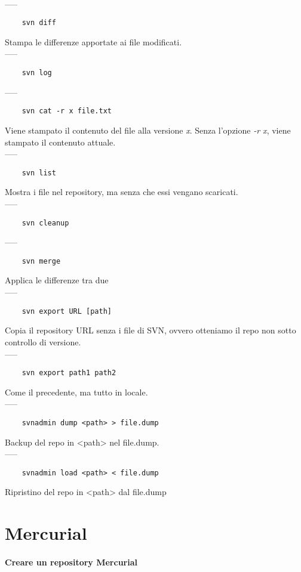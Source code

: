 \documentclass[a4paper]{article}
\begin{document}
	\\-----
	\begin{verbatim}
	svn diff
	\end{verbatim}
	Stampa le differenze apportate ai file modificati.\\-----
	\begin{verbatim}
	svn log
	\end{verbatim}
	-----
	\begin{verbatim}
	svn cat -r x file.txt 
	\end{verbatim}
	Viene stampato il contenuto del file alla versione \textit{x}. Senza l'opzione \textit{-r x}, viene stampato il contenuto attuale.\\-----
	\begin{verbatim}
	svn list
	\end{verbatim}
	Mostra i file nel repository, ma senza che essi vengano scaricati.\\-----
	\begin{verbatim}
	svn cleanup
	\end{verbatim}
	-----
	\begin{verbatim}
	svn merge
	\end{verbatim}
	Applica le differenze tra due\\-----
	\begin{verbatim}
	svn export URL [path]
	\end{verbatim}
	Copia il repository URL senza i file di SVN, ovvero otteniamo il repo non sotto controllo di versione.\\-----
	\begin{verbatim}
	svn export path1 path2
	\end{verbatim}
	Come il precedente, ma tutto in locale.\\-----
	\begin{verbatim}
	svnadmin dump <path> > file.dump
	\end{verbatim}
	Backup del repo in <path> nel file.dump.\\-----
	\begin{verbatim}
	svnadmin load <path> < file.dump
	\end{verbatim}
	Ripristino del repo in <path> dal file.dump
	\section{Mercurial} %
	
	\paragraph{Creare un repository Mercurial}
	
\end{document}
